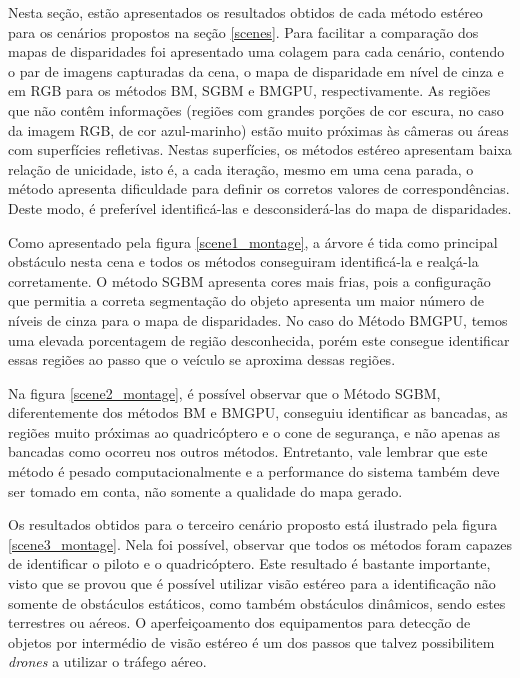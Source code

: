 Nesta seção, estão apresentados os resultados obtidos de cada método estéreo para os cenários propostos na seção \ref{scenes}. Para facilitar a comparação dos mapas de disparidades foi apresentado uma colagem para cada cenário, contendo o par de imagens capturadas da cena, o mapa de disparidade em nível de cinza e em RGB para os métodos BM, SGBM e BMGPU, respectivamente. As regiões que não contêm informações (regiões com grandes porções de cor escura, no caso da imagem RGB, de cor azul-marinho) estão muito próximas às câmeras ou áreas com superfícies refletivas. Nestas superfícies, os métodos estéreo apresentam baixa relação de unicidade, isto é, a cada iteração, mesmo em uma cena parada, o método apresenta dificuldade para definir os corretos valores de correspondências. Deste modo, é preferível identificá-las e desconsiderá-las do mapa de disparidades.

Como apresentado pela figura \ref{scene1_montage}, a árvore é tida como principal obstáculo nesta cena e todos os métodos conseguiram identificá-la e realçá-la corretamente. O método SGBM apresenta cores mais frias, pois a configuração que permitia a correta segmentação do objeto apresenta um maior número de níveis de cinza para o mapa de disparidades. No caso do Método BMGPU, temos uma elevada porcentagem de região desconhecida, porém este consegue identificar essas regiões ao passo que o veículo se aproxima dessas regiões. 

Na figura \ref{scene2_montage}, é possível observar que o Método SGBM, diferentemente dos métodos BM e BMGPU, conseguiu identificar as bancadas, as regiões muito próximas ao quadricóptero e o cone de segurança, e não apenas as bancadas como ocorreu nos outros métodos. Entretanto, vale lembrar que este método é pesado computacionalmente e a performance do sistema também deve ser tomado em conta, não somente a qualidade do mapa gerado. 

Os resultados obtidos para o terceiro cenário proposto está ilustrado pela figura \ref{scene3_montage}. Nela foi possível, observar que todos os métodos foram capazes de identificar o piloto e o quadricóptero. Este resultado é bastante importante, visto que se provou que é possível utilizar visão estéreo para a identificação não somente de obstáculos estáticos, como também obstáculos dinâmicos, sendo estes terrestres ou aéreos. O aperfeiçoamento dos equipamentos para detecção de objetos por intermédio de visão estéreo é um dos passos que talvez possibilitem \textit{drones} a utilizar o tráfego aéreo. 


